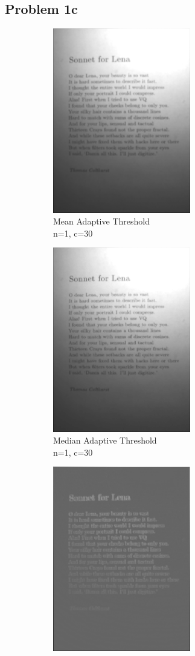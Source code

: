 \documentclass{math}
\begin{document}
\subsection*{Problem 1c}
\begin{figure}[H]
  \begin{subfigure}{0.33\linewidth}
    \centering
    \includegraphics[width=6cm]{assets/hw_01_mean_adaptive_threshold.png}
    \caption{Mean Adaptive Threshold \\ n=1, c=30}
  \end{subfigure}
  \begin{subfigure}{0.33\linewidth}
    \centering
    \includegraphics[width=6cm]{assets/hw_01_median_adaptive_threshold.png}
    \caption{Median Adaptive Threshold \\ n=1, c=30}
  \end{subfigure}
  \begin{subfigure}{0.33\linewidth}
    \centering
    \includegraphics[width=6cm]{assets/hw_01_max_min_adaptive_threshold.png}

\end{subfigure}
\end{figure}
\end{document}
